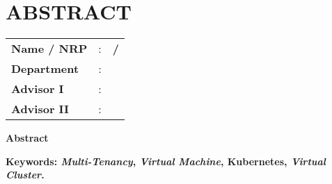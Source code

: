 \chapter*{ABSTRACT}


\vspace{2ex}

\begin{center}
  \large\textbf{\engtatitle{}}
\end{center}

\vspace{2ex}

\begingroup
\setlength{\tabcolsep}{0pt}

\noindent
\begin{tabularx}{\textwidth}{l >{\centering}m{3em} X}
  \textbf{Name / NRP} & : & \textbf{\name{} / \nrp{}} \\
  \textbf{Department} & : & \textbf{\engdepartment{}} \\
  \textbf{Advisor I}  & : & \textbf{\advisor{}}       \\
  \textbf{Advisor II} & : & \textbf{\coadvisor{}}     \\
\end{tabularx}
\endgroup

\noindent
\textbf{Abstract}




\vspace{2ex}
\noindent
\textbf{Keywords: \emph{Multi-Tenancy}, \emph{Virtual Machine}, Kubernetes, \emph{Virtual Cluster}.}
